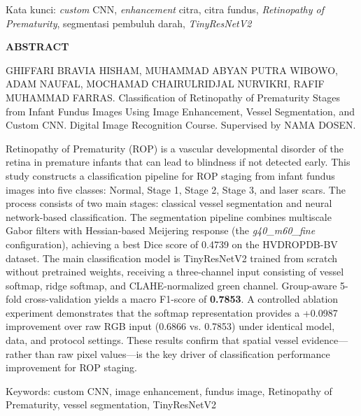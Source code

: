 \vspace{12pt}

\noindent
Kata kunci: \textit{custom} CNN, \textit{enhancement} citra, citra fundus,
\textit{Retinopathy of Prematurity}, segmentasi pembuluh darah, \textit{TinyResNetV2}

\vspace{1.5cm}

\begin{center}
{\fontsize{14pt}{17pt}\selectfont\bfseries ABSTRACT}
\end{center}

\vspace{6pt}

\noindent
GHIFFARI BRAVIA HISHAM, MUHAMMAD ABYAN PUTRA WIBOWO, ADAM NAUFAL,
MOCHAMAD CHAIRULRIDJAL NURVIKRI, RAFIF MUHAMMAD FARRAS.
Classification of Retinopathy of Prematurity Stages from Infant Fundus Images
Using Image Enhancement, Vessel Segmentation, and Custom CNN.
Digital Image Recognition Course. Supervised by NAMA DOSEN.

\vspace{12pt}

\noindent
Retinopathy of Prematurity (ROP) is a vascular developmental disorder of the retina in
premature infants that can lead to blindness if not detected early. This study constructs a
classification pipeline for ROP staging from infant fundus images into five classes: Normal,
Stage 1, Stage 2, Stage 3, and laser scars. The process consists of two main stages: classical
vessel segmentation and neural network-based classification. The segmentation pipeline combines
multiscale Gabor filters with Hessian-based Meijering response (the \textit{g40\_m60\_fine} configuration),
achieving a best Dice score of 0.4739 on the HVDROPDB-BV dataset. The main classification model
is TinyResNetV2 trained from scratch without pretrained weights, receiving a three-channel input
consisting of vessel softmap, ridge softmap, and CLAHE-normalized green channel. Group-aware
5-fold cross-validation yields a macro F1-score of \textbf{0.7853}. A controlled ablation experiment
demonstrates that the softmap representation provides a +0.0987 improvement over raw RGB input
(0.6866 vs. 0.7853) under identical model, data, and protocol settings. These results confirm
that spatial vessel evidence---rather than raw pixel values---is the key driver of classification
performance improvement for ROP staging.

\vspace{12pt}

\noindent
Keywords: custom CNN, image enhancement, fundus image, Retinopathy of Prematurity,
vessel segmentation, TinyResNetV2
